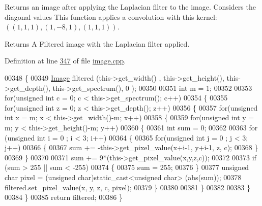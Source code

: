 Returns an image after applying the Laplacian filter to the image. Considers the diagonal values This function applies a convolution with this kernel\-: $ ((1, 1, 1), (1, -8, 1), (1, 1, 1)) $. 

\begin{DoxyReturn}{Returns}
A Filtered image with the Laplacian filter applied. 
\end{DoxyReturn}


Definition at line \hyperlink{image_8cpp_source_l00347}{347} of file \hyperlink{image_8cpp_source}{image.\-cpp}.


\begin{DoxyCode}
00348 \{
00349     \hyperlink{class_image}{Image} filtered (this->get\_width() , this->get\_height(), this->get\_depth(), this->get\_spectrum(), 0
      ); 
00350     
00351     \textcolor{keywordtype}{int} m = 1;
00352     
00353     \textcolor{keywordflow}{for}(\textcolor{keywordtype}{unsigned} \textcolor{keywordtype}{int} c = 0; c < this->get\_spectrum(); c++)
00354     \{
00355         \textcolor{keywordflow}{for}(\textcolor{keywordtype}{unsigned} \textcolor{keywordtype}{int} z = 0; z < this->get\_depth(); z++)
00356         \{
00357             \textcolor{keywordflow}{for}(\textcolor{keywordtype}{unsigned} \textcolor{keywordtype}{int} x = m; x < this->get\_width()-m; x++)
00358             \{
00359                 \textcolor{keywordflow}{for}(\textcolor{keywordtype}{unsigned} \textcolor{keywordtype}{int} y = m; y < this->get\_height()-m; y++)
00360                 \{
00361                     \textcolor{keywordtype}{int} sum = 0;
00362                     
00363                     \textcolor{keywordflow}{for} (\textcolor{keywordtype}{unsigned} \textcolor{keywordtype}{int} i = 0 ; i < 3; i++)
00364                     \{
00365                         \textcolor{keywordflow}{for}(\textcolor{keywordtype}{unsigned} \textcolor{keywordtype}{int} j = 0 ; j < 3; j++)
00366                         \{
00367                         sum += -this->get\_pixel\_value(x+i-1, y+i-1, z, c);
00368                         \}
00369                     \}
00370                     
00371                     sum += 9*(this->get\_pixel\_value(x,y,z,c));
00372                     
00373                     \textcolor{keywordflow}{if} (sum > 255 || sum < -255)
00374                     \{
00375                         sum = 255;
00376                     \}
00377                     \textcolor{keywordtype}{unsigned} \textcolor{keywordtype}{char} pixel = (\textcolor{keywordtype}{unsigned} char)static\_cast<unsigned char> (abs(sum));
00378                     filtered.set\_pixel\_value(x, y, z, c, pixel);
00379                 \}
00380                 
00381              \}
00382              
00383          \}
00384     \}  
00385     \textcolor{keywordflow}{return} filtered; 
00386 \}
\end{DoxyCode}

